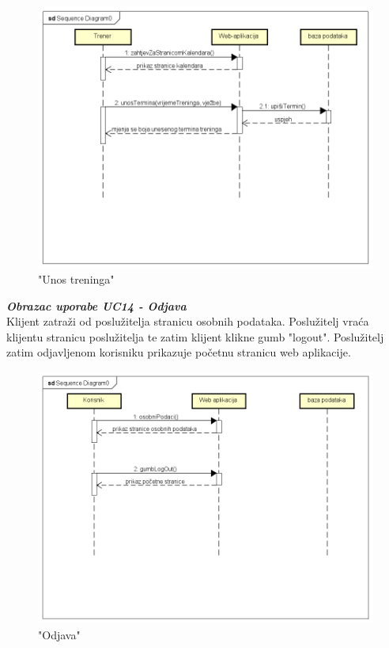 {				
				\begin{figure}[H]
					\includegraphics[scale=0.6]{dijagrami/UC9sekvencijski.png} %
					\centering
					\caption{"Unos treninga"}
					\label{fig:sekvencijski3}
				\end{figure}
				
				\eject
				
				\textbf{\textit{Obrazac uporabe UC14 - Odjava}}\\
				
				
				{Klijent zatraži od poslužitelja stranicu osobnih podataka. Poslužitelj vraća klijentu stranicu poslužitelja te zatim klijent klikne gumb "logout". Poslužitelj zatim odjavljenom korisniku prikazuje početnu stranicu web aplikacije.}
				
				
				\begin{figure}[H]
					\includegraphics[scale=0.6]{dijagrami/UC14.png} %
					\centering
					\caption{"Odjava"}
					\label{fig:sekvencijski4}
				\end{figure}
				
}
